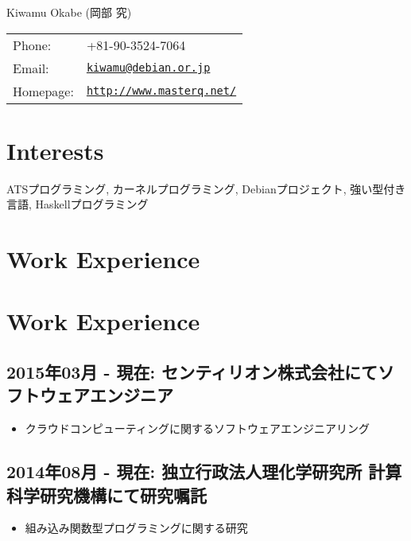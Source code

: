 \documentclass[letterpaper]{article}
\def\name{Kiwamu Okabe (岡部 究)}
\begin{document}
{\huge \name}


\vspace{0.25in}

\begin{minipage}{0.3\linewidth}
  \begin{tabular}{ll}
    Phone: & +81-90-3524-7064 \\
    Email: & \href{mailto:kiwamu@debian.or.jp}{\tt kiwamu@debian.or.jp} \\
    Homepage: & \href{http://www.masterq.net/}{\tt http://www.masterq.net/} \\
  \end{tabular}
\end{minipage}

\section*{Interests}

ATSプログラミング, カーネルプログラミング, Debianプロジェクト, 強い型付き言語, Haskellプログラミング

\section*{Work Experience}
\section*{Work Experience}
\subsection*{2015年03月 - 現在: センティリオン株式会社にてソフトウェアエンジニア}

\begin{itemize}
  \item クラウドコンピューティングに関するソフトウェアエンジニアリング
\end{itemize}

\subsection*{2014年08月 - 現在: 独立行政法人理化学研究所 計算科学研究機構にて研究嘱託}

\begin{itemize}
  \item 組み込み関数型プログラミングに関する研究
\end{itemize}
\end{document}

